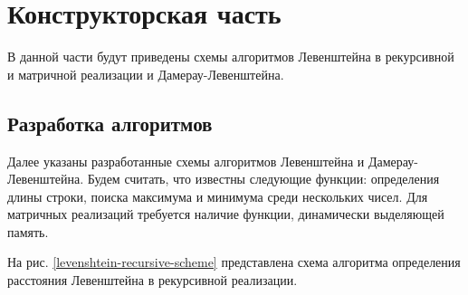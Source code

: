\chapter{Конструкторская часть}
\label{cha:design}

В данной части будут приведены схемы алгоритмов Левенштейна в рекурсивной и матричной реализации и Дамерау-Левенштейна.

\section{Разработка алгоритмов}

Далее указаны разработанные схемы алгоритмов Левенштейна и Дамерау-Левенштейна.
Будем считать, что известны следующие функции:
определения длины строки,
поиска максимума и минимума среди нескольких чисел.
Для матричных реализаций требуется наличие функции, динамически выделяющей память.

На рис. \ref{levenshtein-recursive-scheme} представлена схема алгоритма определения расстояния Левенштейна в рекурсивной реализации.

